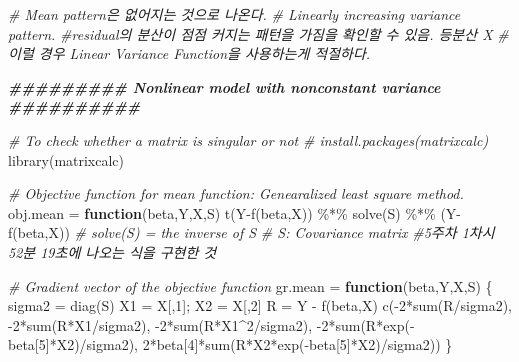 \documentclass[
]{article}
\newenvironment{Shaded}{\begin{snugshade}}{\end{snugshade}}
\newcommand{\CommentTok}[1]{\textcolor[rgb]{0.56,0.35,0.01}{\textit{#1}}}
\newcommand{\ControlFlowTok}[1]{\textcolor[rgb]{0.13,0.29,0.53}{\textbf{#1}}}
\newcommand{\DecValTok}[1]{\textcolor[rgb]{0.00,0.00,0.81}{#1}}
\newcommand{\DocumentationTok}[1]{\textcolor[rgb]{0.56,0.35,0.01}{\textbf{\textit{#1}}}}
\newcommand{\FunctionTok}[1]{\textcolor[rgb]{0.00,0.00,0.00}{#1}}
\newcommand{\NormalTok}[1]{#1}
\newcommand{\OtherTok}[1]{\textcolor[rgb]{0.56,0.35,0.01}{#1}}
\newcommand{\SpecialCharTok}[1]{\textcolor[rgb]{0.00,0.00,0.00}{#1}}
\begin{document}
\begin{Shaded}
\begin{Highlighting}[]
\CommentTok{\# Mean pattern은 없어지는 것으로 나온다. }
\CommentTok{\# Linearly increasing variance pattern.}
\CommentTok{\#residual의 분산이 점점 커지는 패턴을 가짐을 확인할 수 있음. 등분산 X}
\CommentTok{\# 이럴 경우 Linear Variance Function을 사용하는게 적절하다.}

\DocumentationTok{\#\#\#\#\#\#\#\#\# Nonlinear model with nonconstant variance \#\#\#\#\#\#\#\#\#\#}

\CommentTok{\# To check whether a matrix is singular or not}
\CommentTok{\# install.packages(\textquotesingle{}matrixcalc\textquotesingle{}) }
\FunctionTok{library}\NormalTok{(matrixcalc)}

\CommentTok{\# Objective function for mean function: Genearalized least square method.}
\NormalTok{obj.mean }\OtherTok{=} \ControlFlowTok{function}\NormalTok{(beta,Y,X,S) }\FunctionTok{t}\NormalTok{(Y}\SpecialCharTok{{-}}\FunctionTok{f}\NormalTok{(beta,X)) }\SpecialCharTok{\%*\%} \FunctionTok{solve}\NormalTok{(S) }\SpecialCharTok{\%*\%}\NormalTok{ (Y}\SpecialCharTok{{-}}\FunctionTok{f}\NormalTok{(beta,X)) }\CommentTok{\# solve(S) = the inverse of S}
\CommentTok{\# S: Covariance matrix}
\CommentTok{\#5주차 1차시 52분 19초에 나오는 식을 구현한 것}

\CommentTok{\# Gradient vector of the objective function}
\NormalTok{gr.mean }\OtherTok{=} \ControlFlowTok{function}\NormalTok{(beta,Y,X,S)}
\NormalTok{\{}
\NormalTok{  sigma2 }\OtherTok{=} \FunctionTok{diag}\NormalTok{(S)}
\NormalTok{  X1 }\OtherTok{=}\NormalTok{ X[,}\DecValTok{1}\NormalTok{]; X2 }\OtherTok{=}\NormalTok{ X[,}\DecValTok{2}\NormalTok{]}
\NormalTok{  R }\OtherTok{=}\NormalTok{ Y }\SpecialCharTok{{-}} \FunctionTok{f}\NormalTok{(beta,X)}
  \FunctionTok{c}\NormalTok{(}\SpecialCharTok{{-}}\DecValTok{2}\SpecialCharTok{*}\FunctionTok{sum}\NormalTok{(R}\SpecialCharTok{/}\NormalTok{sigma2), }\SpecialCharTok{{-}}\DecValTok{2}\SpecialCharTok{*}\FunctionTok{sum}\NormalTok{(R}\SpecialCharTok{*}\NormalTok{X1}\SpecialCharTok{/}\NormalTok{sigma2), }\SpecialCharTok{{-}}\DecValTok{2}\SpecialCharTok{*}\FunctionTok{sum}\NormalTok{(R}\SpecialCharTok{*}\NormalTok{X1}\SpecialCharTok{\^{}}\DecValTok{2}\SpecialCharTok{/}\NormalTok{sigma2), }
    \SpecialCharTok{{-}}\DecValTok{2}\SpecialCharTok{*}\FunctionTok{sum}\NormalTok{(R}\SpecialCharTok{*}\FunctionTok{exp}\NormalTok{(}\SpecialCharTok{{-}}\NormalTok{beta[}\DecValTok{5}\NormalTok{]}\SpecialCharTok{*}\NormalTok{X2)}\SpecialCharTok{/}\NormalTok{sigma2), }
    \DecValTok{2}\SpecialCharTok{*}\NormalTok{beta[}\DecValTok{4}\NormalTok{]}\SpecialCharTok{*}\FunctionTok{sum}\NormalTok{(R}\SpecialCharTok{*}\NormalTok{X2}\SpecialCharTok{*}\FunctionTok{exp}\NormalTok{(}\SpecialCharTok{{-}}\NormalTok{beta[}\DecValTok{5}\NormalTok{]}\SpecialCharTok{*}\NormalTok{X2)}\SpecialCharTok{/}\NormalTok{sigma2))  }
\NormalTok{\}}


\end{Highlighting}
\end{Shaded}
\end{document}
